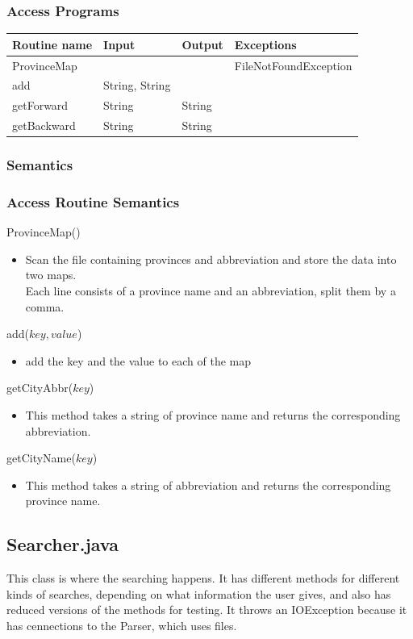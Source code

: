 \documentclass[12pt,fleqn]{article}
\begin{document}
\subsubsection* {Access Programs}
\begin{tabular}{| l | l | l | l |}
\hline
\textbf{Routine name} & \textbf{Input} & \textbf{Output} & \textbf{Exceptions}\\
\hline
ProvinceMap & ~ & ~ & FileNotFoundException\\
\hline
add & String, String & ~ & ~\\
\hline
getForward & String & String & ~\\
\hline
getBackward & String & String & ~\\
\hline
\end{tabular}

\subsubsection*{Semantics}
\subsubsection*{Access Routine Semantics}
\noindent ProvinceMap()
\begin{itemize}
\item Scan the file containing provinces and abbreviation and store the data into two maps.\\Each line consists of
a province name and an abbreviation, split them by a comma. 
\end{itemize}
\noindent add($key, value$)
\begin{itemize}
\item add the key and the value to each of the map
\end{itemize}
\noindent getCityAbbr($key$)
\begin{itemize}
\item This method takes a string of province name and returns the corresponding abbreviation.
\end{itemize}
\noindent getCityName($key$)
\begin{itemize}
\item This method takes a string of abbreviation and returns the corresponding province name.
\end{itemize}


\subsection*{Searcher.java}\label{search}
This class is where the searching happens. It has different methods for different kinds of searches, depending on what information the user gives, and also has reduced versions of the methods for testing. It throws an IOException because it has cennections to the Parser, which uses files.
\end{document}
